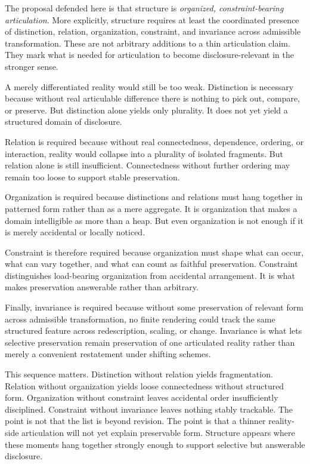 \documentclass[11pt]{article}
\renewcommand{\emph}[1]{\textit{#1}}
\begin{document}
The proposal defended here is that structure is \emph{organized, constraint-bearing articulation}. More explicitly, structure requires at least the coordinated presence of distinction, relation, organization, constraint, and invariance across admissible transformation. These are not arbitrary additions to a thin articulation claim. They mark what is needed for articulation to become disclosure-relevant in the stronger sense. \cite{Cassirer1953SubstanceFunction,Nozick2001Invariances}

A merely differentiated reality would still be too weak. Distinction is necessary because without real articulable difference there is nothing to pick out, compare, or preserve. But distinction alone yields only plurality. It does not yet yield a structured domain of disclosure.

Relation is required because without real connectedness, dependence, ordering, or interaction, reality would collapse into a plurality of isolated fragments. But relation alone is still insufficient. Connectedness without further ordering may remain too loose to support stable preservation.

Organization is required because distinctions and relations must hang together in patterned form rather than as a mere aggregate. It is organization that makes a domain intelligible as more than a heap. But even organization is not enough if it is merely accidental or locally noticed.

Constraint is therefore required because organization must shape what can occur, what can vary together, and what can count as faithful preservation. Constraint distinguishes load-bearing organization from accidental arrangement. It is what makes preservation answerable rather than arbitrary.

Finally, invariance is required because without some preservation of relevant form across admissible transformation, no finite rendering could track the same structured feature across redescription, scaling, or change. Invariance is what lets selective preservation remain preservation of one articulated reality rather than merely a convenient restatement under shifting schemes.

This sequence matters. Distinction without relation yields fragmentation. Relation without organization yields loose connectedness without structured form. Organization without constraint leaves accidental order insufficiently disciplined. Constraint without invariance leaves nothing stably trackable. The point is not that the list is beyond revision. The point is that a thinner reality-side articulation will not yet explain preservable form. Structure appears where these moments hang together strongly enough to support selective but answerable disclosure.
\end{document}
